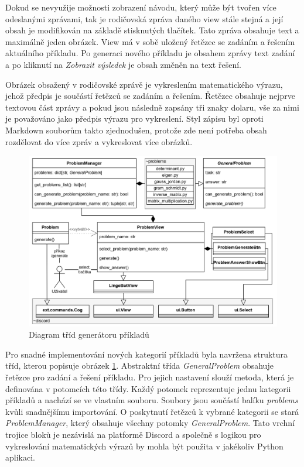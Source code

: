 \documentclass[FM]{tulthesis}
\begin{document}
	Dokud se nevyužije možnosti zobrazení návodu, který může být tvořen více odeslanými zprávami, tak je rodičovská zpráva daného view stále stejná a její obsah je modifikován na základě stisknutých tlačítek. Tato zpráva obsahuje text a maximálně jeden obrázek. View má v sobě uložený řetězec se zadáním a řešením aktuálního příkladu. Po generaci nového příkladu je obsahem zprávy text zadání a po kliknutí na \textit{Zobrazit výsledek} je obsah změněn na text řešení.
	
	Obrázek obsažený v rodičovské zprávě je vykreslením matematického výrazu, jehož předpis je součástí řetězců se zadáním a řešením. Řetězec obsahuje nejprve textovou část zprávy a pokud jsou následně zapsány tři znaky dolaru, vše za nimi je považováno jako předpis výrazu pro vykreslení. Styl zápisu byl oproti \mbox{Markdown} souborům takto zjednodušen, protože zde není potřeba obsah rozdělovat do více zpráv a vykreslovat více obrázků.
	
	\begin{figure}[ht]
		\centering
		\includegraphics[width=\textwidth]{img/ProblemsDiagram}
		\caption{Diagram tříd generátoru příkladů}
		\label{_tag_img_problemuml}
	\end{figure}
	
	Pro snadné implementování nových kategorií příkladů byla navržena struktura tříd, kterou popisuje obrázek \ref{_tag_img_problemuml}. Abstraktní třída \textit{GeneralProblem} obsahuje řetězce pro zadání a řešení příkladu. Pro jejich nastavení slouží metoda, která je definována v potomcích této třídy. Každý potomek reprezentuje jednu kategorii příkladů a nachází se ve vlastním souboru. Soubory jsou součástí balíku \textit{problems} kvůli snadnějšímu importování. O poskytnutí řetězců k vybrané kategorii se stará \mbox{\textit{ProblemManager}}, který obsahuje všechny potomky \textit{GeneralProblem}. Tato vrchní trojice bloků je nezávislá na platformě Discord a společně s logikou pro vykreslování matematických výrazů by mohla být použita v jakékoliv Python aplikaci.
	
\end{document}
